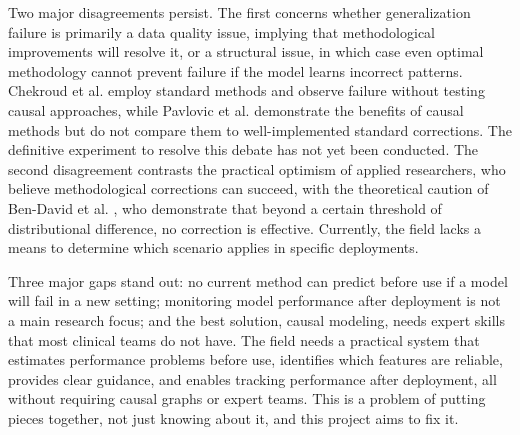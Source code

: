 Two major disagreements persist. The first concerns whether generalization failure is primarily a data quality issue, implying that methodological improvements will resolve it, or a structural issue, in which case even optimal methodology cannot prevent failure if the model learns incorrect patterns. Chekroud et al. \cite{chekroud2024illusory} employ standard methods and observe failure without testing causal approaches, while Pavlovic et al. \cite{pavlovic2024causal} demonstrate the benefits of causal methods but do not compare them to well-implemented standard corrections. The definitive experiment to resolve this debate has not yet been conducted. The second disagreement contrasts the practical optimism of applied researchers, who believe methodological corrections can succeed, with the theoretical caution of Ben-David et al. \cite{bendavid2010theory}, who demonstrate that beyond a certain threshold of distributional difference, no correction is effective. Currently, the field lacks a means to determine which scenario applies in specific deployments.

Three major gaps stand out: no current method can predict before use if a model will fail in a new setting; monitoring model performance after deployment is not a main research focus; and the best solution, causal modeling, needs expert skills that most clinical teams do not have. The field needs a practical system that estimates performance problems before use, identifies which features are reliable, provides clear guidance, and enables tracking performance after deployment, all without requiring causal graphs or expert teams. This is a problem of putting pieces together, not just knowing about it, and this project aims to fix it.